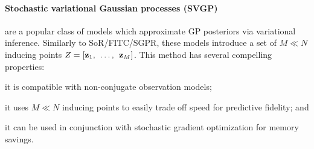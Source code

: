 \paragraph{Stochastic variational Gaussian processes (SVGP)}
\cite{hensman2013gaussian,hensman2015scalable,matthews2016sparse} are a popular class of models which approximate GP posteriors via variational inference.
Similarly to SoR/FITC/SGPR, these models introduce a set of $M \ll N$ inducing points $Z = [\mathbf{z}_1, \:\: \ldots, \:\: \mathbf{z}_M]$.
This method has several compelling properties:
\begin{enumerate*}
  \item it is compatible with non-conjugate observation models;
  \item it uses $M \ll N$ inducing points to easily trade off speed for predictive fidelity; and
  \item it can be used in conjunction with stochastic gradient optimization for memory savings.
\end{enumerate*}

